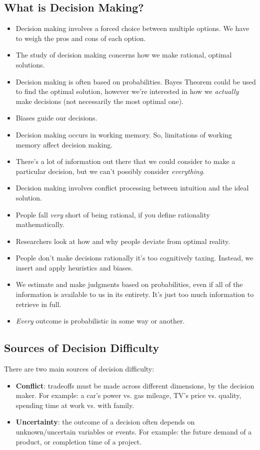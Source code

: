 \documentclass[]{article}
\newcommand{\lecture}[1]{\marginpar{{\footnotesize $\leftarrow$ \underline{#1}}}}
\begin{document}
		\subsection{What is Decision Making?}
			\begin{itemize}
				\item Decision making involves a forced choice between multiple options. We have to weigh the pros and cons of each option.
				\item The study of decision making concerns how we make rational, optimal solutions.
				\item Decision making is often based on probabilities. Bayes Theorem could be used to find the optimal solution, however we're interested in how we \emph{actually} make decisions (not necessarily the most optimal one).
				\item Biases guide our decisions.
				\item Decision making occurs in working memory. So, limitations of working memory affect decision making.
				\item There's a lot of information out there that we could consider to make a particular decision, but we can't possibly consider \emph{everything}.
				\item Decision making involves conflict processing between intuition and the ideal solution.
				\item People fall \emph{very} short of being rational, if you define rationality mathematically.
				\item Researchers look at how and why people deviate from optimal reality. \lecture{March 26, 2013}
				\item People don't make decisions rationally \textendash{} it's too cognitively taxing. Instead, we insert and apply heuristics and biases.
				\item We estimate and make judgments based on probabilities, even if all of the information is available to us in its entirety. It's just too much information to retrieve in full.
				\item \emph{Every} outcome is probabilistic in some way or another.
			\end{itemize}

		\subsection{Sources of Decision Difficulty}
			There are two main sources of decision difficulty:
			\begin{itemize}
				\item \textbf{Conflict}: tradeoffs must be made across different dimensions, by the decision maker. For example: a car's power vs. gas mileage, TV's price vs. quality, spending time at work vs. with family.
				\item \textbf{Uncertainty}: the outcome of a decision often depends on unknown/uncertain variables or events. For example: the future demand of a product, or completion time of a project.
			\end{itemize}
\end{document}
